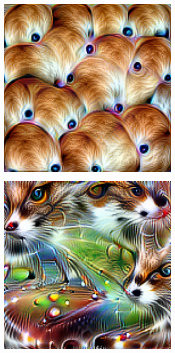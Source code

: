 \begin{figure}[!htb]
\begin{center}
\begin{subfigure}[h]{0.23\textwidth}
		\end{subfigure}
		\hfill
		\begin{subfigure}[h]{0.23\textwidth}
			\centering
			\includegraphics[width=1\textwidth]{"contents/images/02-feature-dog-2"}
		\end{subfigure}
		\hfill
		\begin{subfigure}[h]{0.23\textwidth}
			\centering
			\includegraphics[width=1\textwidth]{"contents/images/02-feature-cat-2"}

\end{subfigure}
\end{center}
\end{figure}
